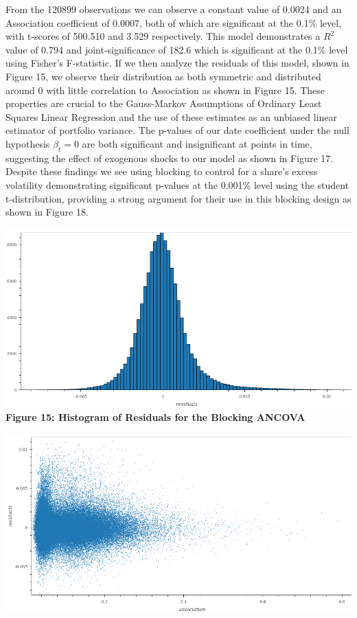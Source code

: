 \documentclass[11pt]{article}
\makeatletter
\def\maxwidth{\ifdim\Gin@nat@width>\linewidth\linewidth
    \else\Gin@nat@width\fi}
\let\Oldincludegraphics\includegraphics
\renewcommand{\includegraphics}[1]{\Oldincludegraphics[width=.8\maxwidth]{#1}}
\makeatother
\begin{document}
\newpage

From the 120899 observations we can observe a constant value of 0.0024
and an Association coefficient of 0.0007, both of which are significant
at the 0.1\% level, with t-scores of 500.510 and 3.529 respectively.
This model demonstrates a \(R^2\) value of 0.794 and joint-significance
of 182.6 which is significant at the 0.1\% level using Fisher's
F-statistic. If we then analyze the residuals of this model, shown in
Figure 15, we observe their distribution as both symmetric and
distributed around 0 with little correlation to Association as shown in
Figure 15. These properties are crucial to the Gauss-Markov Assumptions
of Ordinary Least Squares Linear Regression and the use of these
estimates as an unbiased linear estimator of portfolio variance. The
p-values of our date coefficient under the null hypothesis
\(\beta_{t} = 0\) are both significant and insignificant at points in
time, suggesting the effect of exogenous shocks to our model as shown in
Figure 17. Despite these findings we see using blocking to control for a
share's excess volatility demonstrating significant p-values at the
0.001\% level using the student t-distribution, providing a strong
argument for their use in this blocking design as shown in Figure 18.

\includegraphics{../experiments/media/Histogram of Residuals of Blocking Ancova.png}\\

\textbf{Figure 15: Histogram of Residuals for the Blocking ANCOVA}

\includegraphics{../experiments/media/Scatter Plot of Residuals of Blocking Ancova.png}\\
\end{document}
